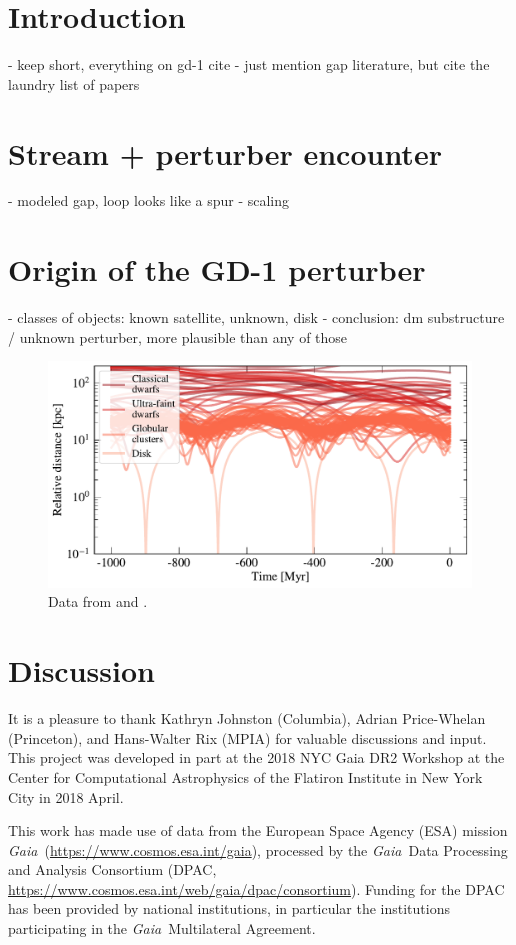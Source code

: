 \documentclass[12pt, modern]{aastex62}
\newcommand{\acronym}[1]{{\small{#1}}}
\newcommand{\Gaia}{\textsl{Gaia}}
\begin{document}

\section{Introduction}
\label{sec:intro}
- keep short, everything on gd-1 cite
- just mention gap literature, but cite the laundry list of papers

\section{Stream + perturber encounter}
\label{sec:model}
- modeled gap, loop looks like a spur
- scaling

\section{Origin of the GD-1 perturber}
\label{sec:origin}
- classes of objects: known satellite, unknown, disk
- conclusion: dm substructure / unknown perturber, more plausible than any of those

\begin{figure}
\begin{center}
\includegraphics[width=\textwidth]{satellite_distances.pdf}
\end{center}
\caption{Data from \citet{simon2018} and \citet{gdr2_satellites}.}
\label{fig:known_encounters}
\end{figure}

\section{Discussion}

\acknowledgements
It is a pleasure to thank
  Kathryn Johnston (Columbia),
  Adrian Price-Whelan (Princeton),
  and
  Hans-Walter Rix (MPIA)
for valuable discussions and input.
This project was developed in part at the
2018 NYC Gaia DR2 Workshop at the Center for Computational Astrophysics of
the Flatiron Institute in New York City in 2018 April.

This work has made use of data from the European Space Agency (ESA) mission
\Gaia\ (\url{https://www.cosmos.esa.int/gaia}), processed by the \Gaia\ Data
Processing and Analysis Consortium (\acronym{DPAC},
\url{https://www.cosmos.esa.int/web/gaia/dpac/consortium}). Funding for the
\acronym{DPAC}
has been provided by national institutions, in particular the institutions
participating in the \Gaia\ Multilateral Agreement.



\end{document}
